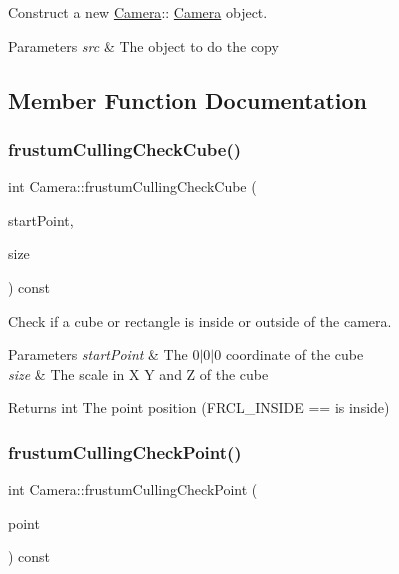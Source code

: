 Construct a new \hyperlink{class_camera}{Camera}\+:\+: \hyperlink{class_camera}{Camera} object. 


\begin{DoxyParams}{Parameters}
{\em src} & The object to do the copy \\
\hline
\end{DoxyParams}


\subsection{Member Function Documentation}
\mbox{\label{class_camera_a7baca010a22bac712351e4c6adca5acf}} 
\subsubsection{\texorpdfstring{frustum\+Culling\+Check\+Cube()}{frustumCullingCheckCube()}}
{\footnotesize\ttfamily int Camera\+::frustum\+Culling\+Check\+Cube (\begin{DoxyParamCaption}\item[{C\+A\+M\+E\+R\+A\+\_\+\+V\+E\+C3 const \&}]{start\+Point,  }\item[{C\+A\+M\+E\+R\+A\+\_\+\+V\+E\+C3 const \&}]{size }\end{DoxyParamCaption}) const}



Check if a cube or rectangle is inside or outside of the camera. 


\begin{DoxyParams}{Parameters}
{\em start\+Point} & The 0$\vert$0$\vert$0 coordinate of the cube \\
\hline
{\em size} & The scale in X Y and Z of the cube \\
\hline
\end{DoxyParams}
\begin{DoxyReturn}{Returns}
int The point position (F\+R\+C\+L\+\_\+\+I\+N\+S\+I\+DE == is inside) 
\end{DoxyReturn}
\mbox{\label{class_camera_aa7a544e123a54e98509cfc6050869aca}} 
\subsubsection{\texorpdfstring{frustum\+Culling\+Check\+Point()}{frustumCullingCheckPoint()}}
{\footnotesize\ttfamily int Camera\+::frustum\+Culling\+Check\+Point (\begin{DoxyParamCaption}\item[{C\+A\+M\+E\+R\+A\+\_\+\+V\+E\+C3 const \&}]{point }\end{DoxyParamCaption}) const}



